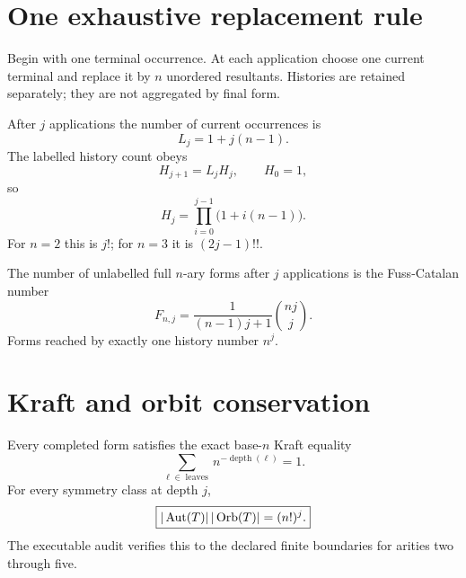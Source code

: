 \documentclass[11pt,a4paper]{article}
\begin{document}
\MakeResearchTitle
\MakeResearchContents
{}
\section{One exhaustive replacement rule}
Begin with one terminal occurrence. At each application choose one current terminal and replace it by $n$ unordered resultants. Histories are retained separately; they are not aggregated by final form.

After $j$ applications the number of current occurrences is
\begin{equation}
L_j=1+j(n-1).
\end{equation}
The labelled history count obeys
\begin{equation}
H_{j+1}=L_jH_j,\qquad H_0=1,
\end{equation}
so
\begin{equation}
\boxed{H_j=\prod_{i=0}^{j-1}\bigl(1+i(n-1)\bigr).}
\end{equation}
For $n=2$ this is $j!$; for $n=3$ it is $(2j-1)!!$.

The number of unlabelled full $n$-ary forms after $j$ applications is the Fuss-Catalan number
\begin{equation}
F_{n,j}=\frac{1}{(n-1)j+1}\binom{nj}{j}.
\end{equation}
Forms reached by exactly one history number $n^j$.

\section{Kraft and orbit conservation}
Every completed form satisfies the exact base-$n$ Kraft equality
\begin{equation}
\sum_{\ell\in\operatorname{leaves}}n^{-\operatorname{depth}(\ell)}=1.
\end{equation}
For every symmetry class at depth $j$,
\begin{equation}
\boxed{|\operatorname{Aut}(T)|\,|\operatorname{Orb}(T)|=(n!)^j.}
\end{equation}
The executable audit verifies this to the declared finite boundaries for arities two through five.
\end{document}
